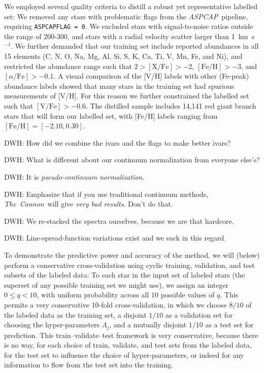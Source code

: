 \documentclass[12pt,preprint]{aastex}
\newcommand{\project}[1]{\textsl{#1}}
\newcommand{\TheCannon}{\project{The~Cannon}}
\newcommand{\acronym}[1]{{\small{#1}}}
\newcommand{\aspcap}{\project{\acronym{ASPCAP}}}
\begin{document}
We employed several quality criteria to distill a robust yet representative 
labelled set: We removed any stars with problematic flags from the \aspcap\
pipeline, requiring \texttt{ASPCAPFLAG = 0}.  We excluded stars with 
signal-to-noise ratios outside the range of 200-300, and stars with a radial 
velocity scatter larger than 1~km~s$^{-1}$.  We further demanded that
our training set include reported abundances in all 15 elements (C, N, O, Na, 
Mg, Al, Si, S, K, Ca, Ti, V, Mn, Fe, and Ni), and restricted the abundance range
such that $2 > \mathrm{[X/Fe]} > -2$, $\mathrm{[Fe/H]} > -3$, and 
$[\alpha/\mathrm{Fe}] > -0.1$.  A visual comparison of the [V/H] labels
with other (Fe-peak) abundance labels showed that many stars in the training set had
spurious measurements of [V/H]. For this reason we further constrained the
labelled set such that $\mathrm{[V/Fe]} > -0.6$.  The distilled sample
includes 14,141 red giant branch stars that will form our labelled set, with [Fe/H] labels ranging from
$\mathrm{[Fe/H]} = [-2.10, 0.30]$. 

DWH: How did we combine the ivars and the flags to make better ivars?

DWH: What is different about our continuum normalization from everyone else's?

DWH: It is \emph{pseudo-continuum normalization}.

DWH: Emphasize that if you use traditional continuum methods,
\TheCannon\ will give \emph{very bad results}.  Don't do that.

DWH: We re-stacked the spectra ourselves, because we are that hardcore.

DWH: Line-spread-function variations exist and we suck in this regard.




To demonstrate the predictive power and accuracy of the method, we
will (below) perform a conservative cross-validation using cyclic
training, validation, and test subsets of the labeled data:
To each star in the input set of labeled stars (the superset of any
possible training set we might use), we assign an integer $0\leq
q<10$, with uniform probability across all 10 possible values of $q$.
This permits a very conservative 10-fold cross-validation, in which we
choose $8/10$ of the labeled data as the training set, a disjoint
$1/10$ as a validation set for choosing the hyper-parameters
$\Lambda_j$, and a mutually disjoint $1/10$ as a test set for
prediction.
This train--validate--test framework is very conservative, because there
is no way, for each choice of train, validate, and test sets from the
labeled data, for the test set to influence the choice of
hyper-parameters, or indeed for any information to flow from the test
set into the training.
\end{document}

